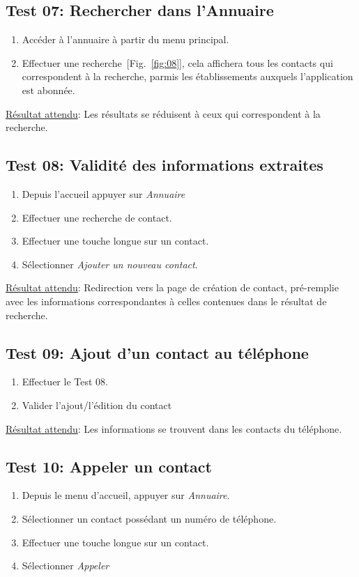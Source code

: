   \subsection*{Test 07: Rechercher dans l'Annuaire}
    \begin{enumerate}
    \item Accéder à l'annuaire à partir du menu principal.
    \item Effectuer une recherche~[Fig.~\ref{fig:08}], cela affichera tous les contacts qui correspondent à la recherche, parmis les établissements auxquels l'application est abonnée.
    \end{enumerate}

    \underline{Résultat attendu}: Les résultats se réduisent à ceux qui correspondent à la recherche.

  \subsection*{Test 08: Validité des informations extraites}
    \begin{enumerate}
    \item Depuis l'accueil appuyer sur \emph{Annuaire}
    \item Effectuer une recherche de contact.
    \item Effectuer une touche longue sur un contact.
    \item Sélectionner \emph{Ajouter un nouveau contact}.
    \end{enumerate}

    \underline{Résultat attendu}: Redirection vers la page de création de contact, pré-remplie avec les informations correspondantes à celles contenues dans le résultat de recherche.

  \subsection*{Test 09: Ajout d'un contact au téléphone}
    \begin{enumerate}
    \item Effectuer le Test 08.
    \item Valider l'ajout/l'édition du contact
    \end{enumerate}

    \underline{Résultat attendu}: Les informations se trouvent dans les contacts du téléphone.

  \subsection*{Test 10: Appeler un contact}
    \begin{enumerate}
    \item Depuis le menu d'accueil, appuyer sur \emph{Annuaire}.
    \item Sélectionner un contact possédant un numéro de téléphone.
    \item Effectuer une touche longue sur un contact.
    \item Sélectionner \emph{Appeler}
    \end{enumerate}

